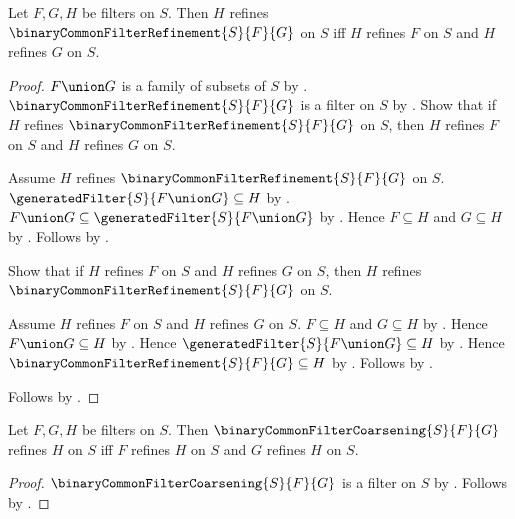 \begin{theorem}\label{binary_common_filter_refinement_universal}
    Let $F,G,H$ be filters on $S$.
    Then $H$ refines $\binaryCommonFilterRefinement{S}{F}{G}$ on $S$ iff
        $H$ refines $F$ on $S$ and $H$ refines $G$ on $S$.
\end{theorem}
\begin{proof}
    $F\union G$ is a family of subsets of $S$ by
        .
    $\binaryCommonFilterRefinement{S}{F}{G}$ is a filter on $S$ by
        .
    Show that if $H$ refines $\binaryCommonFilterRefinement{S}{F}{G}$ on $S$,
        then $H$ refines $F$ on $S$ and $H$ refines $G$ on $S$.
    \begin{subproof}
        Assume $H$ refines $\binaryCommonFilterRefinement{S}{F}{G}$ on $S$.
        $\generatedFilter{S}{F\union G}\subseteq H$ by
            .
        $F\union G\subseteq\generatedFilter{S}{F\union G}$ by
            .
        Hence $F\subseteq H$ and $G\subseteq H$ by
            .
        Follows by .
    \end{subproof}
    Show that if $H$ refines $F$ on $S$ and $H$ refines $G$ on $S$, then
        $H$ refines $\binaryCommonFilterRefinement{S}{F}{G}$ on $S$.
    \begin{subproof}
        Assume $H$ refines $F$ on $S$ and $H$ refines $G$ on $S$.
        $F\subseteq H$ and $G\subseteq H$ by .
        Hence $F\union G\subseteq H$ by .
        Hence $\generatedFilter{S}{F\union G}\subseteq H$ by
            .
        Hence $\binaryCommonFilterRefinement{S}{F}{G}\subseteq H$ by
            .
        Follows by .
    \end{subproof}
    Follows by \auto.
\end{proof}

\begin{theorem}\label{binary_common_filter_coarsening_universal}
    Let $F,G,H$ be filters on $S$.
    Then $\binaryCommonFilterCoarsening{S}{F}{G}$ refines $H$ on $S$ iff
        $F$ refines $H$ on $S$ and $G$ refines $H$ on $S$.
\end{theorem}
\begin{proof}
    $\binaryCommonFilterCoarsening{S}{F}{G}$ is a filter on $S$ by
        .
    Follows by
        .
\end{proof}
